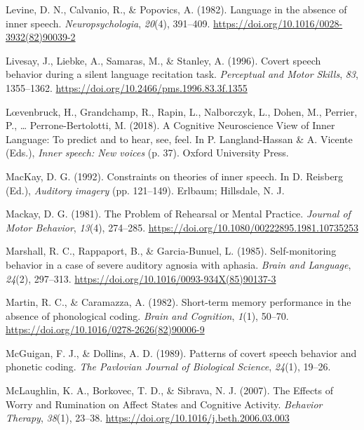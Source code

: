 \documentclass[a4paper,12pt,twoside,openright,oldfontcommands]{memoir}
\begin{document}
\hypertarget{ref-levine_language_1982}{}
Levine, D. N., Calvanio, R., \& Popovics, A. (1982). Language in the
absence of inner speech. \emph{Neuropsychologia}, \emph{20}(4),
391--409. \url{https://doi.org/10.1016/0028-3932(82)90039-2}

\hypertarget{ref-livesay_covert_1996}{}
Livesay, J., Liebke, A., Samaras, M., \& Stanley, A. (1996). Covert
speech behavior during a silent language recitation task.
\emph{Perceptual and Motor Skills}, \emph{83}, 1355--1362.
\url{https://doi.org/10.2466/pms.1996.83.3f.1355}

\hypertarget{ref-loevenbruck_cognitive_2018}{}
Lœvenbruck, H., Grandchamp, R., Rapin, L., Nalborczyk, L., Dohen, M.,
Perrier, P., \ldots{} Perrone-Bertolotti, M. (2018). A Cognitive
Neuroscience View of Inner Language: To predict and to hear, see, feel.
In P. Langland-Hassan \& A. Vicente (Eds.), \emph{Inner speech: New
voices} (p. 37). Oxford University Press.

\hypertarget{ref-mackay_constraints_1992}{}
MacKay, D. G. (1992). Constraints on theories of inner speech. In D.
Reisberg (Ed.), \emph{Auditory imagery} (pp. 121--149). Erlbaum;
Hillsdale, N. J.

\hypertarget{ref-mackay_problem_1981}{}
Mackay, D. G. (1981). The Problem of Rehearsal or Mental Practice.
\emph{Journal of Motor Behavior}, \emph{13}(4), 274--285.
\url{https://doi.org/10.1080/00222895.1981.10735253}

\hypertarget{ref-marshall_self-monitoring_1985}{}
Marshall, R. C., Rappaport, B., \& Garcia-Bunuel, L. (1985).
Self-monitoring behavior in a case of severe auditory agnosia with
aphasia. \emph{Brain and Language}, \emph{24}(2), 297--313.
\url{https://doi.org/10.1016/0093-934X(85)90137-3}

\hypertarget{ref-martin_short-term_1982}{}
Martin, R. C., \& Caramazza, A. (1982). Short-term memory performance in
the absence of phonological coding. \emph{Brain and Cognition},
\emph{1}(1), 50--70. \url{https://doi.org/10.1016/0278-2626(82)90006-9}

\hypertarget{ref-mcguigan_patterns_1989}{}
McGuigan, F. J., \& Dollins, A. D. (1989). Patterns of covert speech
behavior and phonetic coding. \emph{The Pavlovian Journal of Biological
Science}, \emph{24}(1), 19--26.

\hypertarget{ref-mclaughlin_effects_2007}{}
McLaughlin, K. A., Borkovec, T. D., \& Sibrava, N. J. (2007). The
Effects of Worry and Rumination on Affect States and Cognitive Activity.
\emph{Behavior Therapy}, \emph{38}(1), 23--38.
\url{https://doi.org/10.1016/j.beth.2006.03.003}
\end{document}
